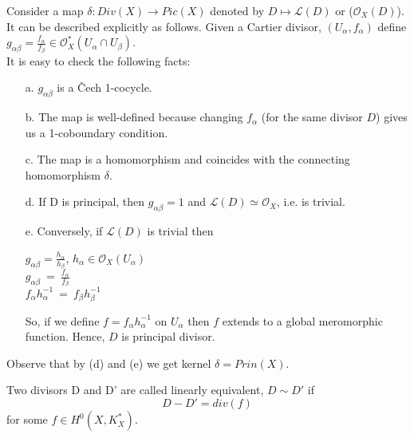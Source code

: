 Consider a map $\delta: Div(X) \rightarrow Pic(X)$ denoted by $D \mapsto \mathcal{L}(D)$ or ($\mathcal{O}_X(D)$). It can be described explicitly as follows. Given a Cartier divisor, $({U_{\alpha}}, {f_{\alpha}})$ define $g_{\alpha\beta}=\frac{f_{\alpha}}{f_{\beta}} \in \mathcal{O}^{*}_{X}(U_{\alpha}\cap U_{\beta})$.\\

It is easy to check the following facts:

\begin{itemize}
\item[a.] $g_{\alpha\beta}$ is a \v{C}ech 1-cocycle.
\item[b.] The map is well-defined because changing $f_{\alpha}$ (for the same divisor $D$) gives us a 1-coboundary condition.
\item[c.] The map is a homomorphism and coincides with the connecting homomorphism $\delta$.
\item[d.] If D is principal, then $g_{\alpha\beta}=1$ and $\mathcal{L}(D)\simeq \mathcal{O}_X$, i.e. is trivial.
\item[e.] Conversely, if $\mathcal{L}(D)$ is trivial then 
\begin{center}
$g_{\alpha\beta}=\frac{h_{\alpha}}{h_{\beta}}$, $h_{\alpha}\in\mathcal{O}_X(U_{\alpha})$\\
$g_{\alpha\beta}~=~\frac{f_{\alpha}}{f_{\beta}}$\\
$f_{\alpha} h_{\alpha}^{-1}~=~f_{\beta} h_{\beta}^{-1}$ 
\end{center}
So, if we define $f=f_{\alpha} h_{\alpha}^{-1}$ on $U_{\alpha}$ then $f$ extends to a global meromorphic function. Hence, $D$ is principal divisor.

\end{itemize}

Observe that by (d) and (e) we get kernel $\delta=Prin(X)$.

\begin{definition}

Two divisors D and D' are called linearly equivalent, $D\sim D'$ if $$D-D'=div(f)$$ for some $f \in H^0(X,K^*_X)$.

\end{definition}

